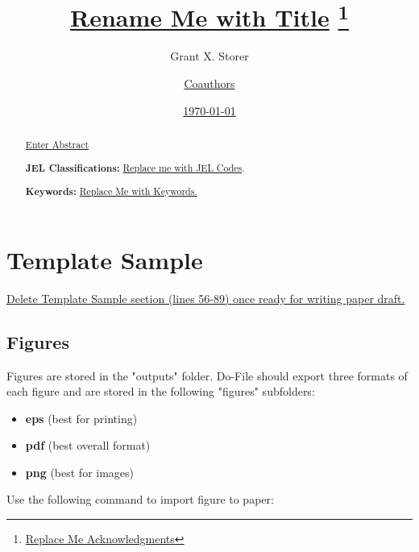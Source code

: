 \documentclass[12pt]{article}
\title
{
	\underline{Rename Me with Title}
	\thanks
	{
		\noindent \underline{Replace Me Acknowledgments}
	}
}%
\author
{
	Grant X. Storer 
	\and 
	\underline{Coauthors}
}%
\date
{
	\underline{\today}
}%
\begin{document}
\maketitle%


\begin{abstract}
\underline{Enter Abstract}

\bigskip

\noindent 	\textbf{JEL Classifications:} 
			\underline{Replace me with JEL Codes}.

\noindent 	\textbf{Keywords:} 
			\underline{ Replace Me with Keywords.}
\end{abstract}

\bigskip \pagebreak


\section{Template Sample}

\underline
{
	Delete Template Sample section (lines 56-89) 
	once ready for writing paper draft.
}

\subsection{Figures}

Figures are stored in the "outputs" folder. 
Do-File should export three formats of each figure and 
are stored in the following "figures" subfolders:

\begin{itemize}
	\item \textbf{eps} (best for printing)
	\item \textbf{pdf} (best overall format)
	\item \textbf{png} (best for images)
\end{itemize}


Use the following command to import figure to paper: 
\end{document}
